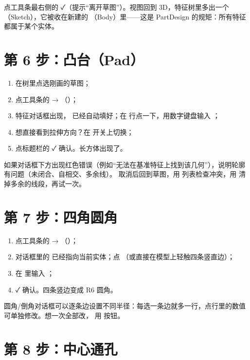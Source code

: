 点工具条最右侧的 ✓（提示“离开草图”）。视图回到 3D，特征树里多出一个 （Sketch），它被收在新建的
（Body）里——这是 PartDesign 的规矩：所有特征都属于某个实体。

\section{第 6 步：凸台（Pad）}

\begin{enumerate}
  \item 在树里点选刚画的草图；
  \item 点工具条的  → （）；
  \item 特征对话框出现， 已经自动填好；在  行点一下，用数字键盘输入 ；
  \item 想直接看到拉伸方向？在  开关上切换；
  \item 点标题栏的 ✓ 确认。长方体出现了。
\end{enumerate}

\begin{warn}[特征失败怎么办？]
如果对话框下方出现红色错误（例如“无法在基准特征上找到该几何”），说明轮廓有问题（未闭合、自相交、多余线）。
取消后回到草图，用  列表检查冲突，用  清掉多余的线段，再试一次。
\end{warn}

\section{第 7 步：四角圆角}

\begin{enumerate}
  \item 点工具条的  → （）；
  \item 对话框里的  已经指向当前实体；点 （或直接在模型上轻触四条竖直边）；
  \item 在  里输入 ；
  \item ✓ 确认。四条竖边变成 R6 圆角。
\end{enumerate}

\begin{tip}[圆角和倒角的“边表”]
圆角/倒角对话框可以逐条边设置不同半径：每选一条边就多一行，点行里的数值可单独修改。想一次全部改，
用  按钮。
\end{tip}

\section{第 8 步：中心通孔}


